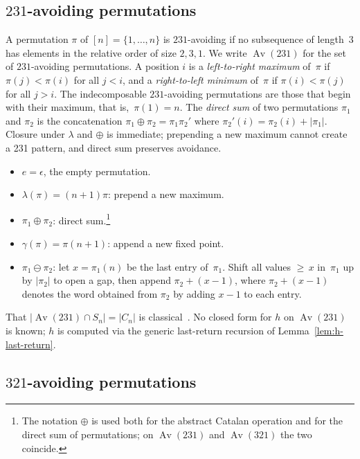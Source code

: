 \documentclass[a4paper,11pt]{article}
\theoremstyle{definition}
\DeclareMathOperator{\Av}{Av}
\begin{document}
\subsection{$231$-avoiding permutations}\label{sec:av231}

A permutation $\pi$ of $[n] = \{1, \ldots, n\}$ is $231$-avoiding if no
subsequence of length~$3$ has elements in the relative order of size $2,3,1$. We
write $\Av(231)$ for the set of $231$-avoiding permutations.  A position $i$ is
a \emph{left-to-right maximum} of~$\pi$ if $\pi(j) < \pi(i)$ for all $j < i$,
and a \emph{right-to-left minimum} of~$\pi$ if $\pi(i) < \pi(j)$ for all
$j > i$.  The indecomposable $231$-avoiding permutations are those that begin
with their maximum, that is,\ $\pi(1) = n$.  The \emph{direct sum} of two
permutations $\pi_1$ and $\pi_2$ is the concatenation
$\pi_1\oplus\pi_2=\pi_1\pi_2'$ where $\pi_2'(i)=\pi_2(i)+|\pi_1|$.  Closure
under $\lambda$ and $\oplus$ is immediate; prepending a new maximum cannot
create a 231 pattern, and direct sum preserves avoidance.
\begin{itemize}
\item $e = \epsilon$, the empty permutation.
\item $\lambda(\pi) = (n{+}1) \pi$: prepend a new
  maximum.
\item $\pi_1 \oplus \pi_2$: direct sum.\footnote{The
  notation $\oplus$ is used both for the abstract
  Catalan operation and for the direct sum of
  permutations; on $\Av(231)$ and $\Av(321)$ the two
  coincide.}
\item $\gamma(\pi) = \pi (n{+}1)$: append a new
  fixed point.
\item $\pi_1 \ominus \pi_2$: let $x = \pi_1(n)$ be the
  last entry of~$\pi_1$. Shift all values ${\geq}\, x$
  in~$\pi_1$ up by $|\pi_2|$ to open a gap, then
  append $\pi_2 + (x{-}1)$, where $\pi_2 + (x{-}1)$
  denotes the word obtained from $\pi_2$ by adding
  $x-1$ to each entry.
\end{itemize}
That $|\Av(231) \cap S_n| = |C_n|$ is
classical~\cite[\S2.2.1, Ex.~4--5]{Knuth68}.
No closed form for $h$ on $\Av(231)$ is known; $h$ is
computed via the generic last-return recursion of
Lemma~\ref{lem:h-last-return}.

\subsection{$321$-avoiding permutations}\label{sec:av321}
\end{document}
